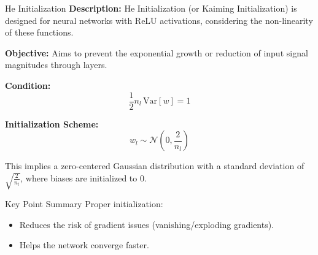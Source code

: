 \documentclass[serif, aspectratio=169]{beamer}
\begin{document}
\begin{frame}{He Initialization}
    \textbf{Description:} 
    He Initialization (or Kaiming Initialization) is designed for neural networks with ReLU activations, considering the non-linearity of these functions.
    
    \textbf{Objective:} 
    Aims to prevent the exponential growth or reduction of input signal magnitudes through layers.

    \textbf{Condition:}
    \[
    \frac{1}{2} n_l \, \text{Var}[w] = 1
    \]
    
    \textbf{Initialization Scheme:}
    \[
    w_l \sim \mathcal{N}\left(0, \frac{2}{n_l}\right)
    \]
    
    This implies a zero-centered Gaussian distribution with a standard deviation of \( \sqrt{\frac{2}{n_l}} \), where biases are initialized to 0.
\end{frame}

\begin{frame}{Key Point Summary}
    Proper initialization:
    \begin{itemize}
        \item Reduces the risk of gradient issues (vanishing/exploding gradients).
        \item Helps the network converge faster.
    \end{itemize}
\end{frame}


        
        
        
\end{document}
